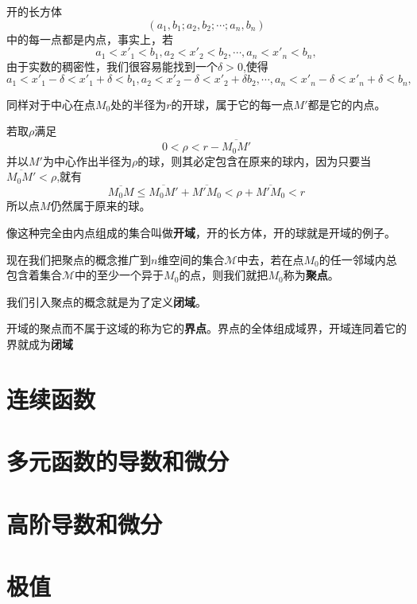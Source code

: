 \documentclass[lang=cn,10pt]{elegantbook}
\begin{document}
开的长方体
\begin{equation*}
		(a_{1},b_{1};a_{2},b_{2};\cdots;a_{n},b_{n})
\end{equation*}
中的每一点都是内点，事实上，若
\begin{equation*}
	a_{1}< x'_{1}< b_{1},a_{2}< x'_{2}< b_{2},\cdots,a_{n}< x'_{n}< b_{n},
\end{equation*}
由于实数的稠密性，我们很容易能找到一个$\delta>0$,使得
\begin{equation*}
	a_{1}< x'_{1}-\delta<x'_{1}+\delta< b_{1},a_{2}< x'_{2}-\delta<x'_{2}+\delta b_{2},\cdots,a_{n}< x'_{n}-\delta<x'_{n}+\delta< b_{n},
\end{equation*}

同样对于中心在点$M_{0}$处的半径为$r$的开球，属于它的每一点$M'$都是它的内点。

若取$\rho$满足
\begin{equation*}
	0<\rho<r-\overline{M_{0}M'}
\end{equation*}
并以$M'$为中心作出半径为$\rho$的球，则其必定包含在原来的球内，因为只要当$\overline{M_{0}M'}<\rho $,就有
\begin{equation*}
	\overline{M_{0}M}\le \overline{M_{0}M'} +\overline{M'M_{0}}<\rho +\overline{M'M_{0}}<r
\end{equation*}
所以点$M$仍然属于原来的球。

像这种完全由内点组成的集合叫做\textbf{开域}，开的长方体，开的球就是开域的例子。

现在我们把聚点的概念推广到$n$维空间的集合$\mathcal{M}$中去，若在点$M_{0}$的任一邻域内总包含着集合$\mathcal{M}$中的至少一个异于$M_{0}$的点，则我们就把$M_{0}$称为\textbf{聚点}。

我们引入聚点的概念就是为了定义\textbf{闭域}。

开域的聚点而不属于这域的称为它的\textbf{界点}。界点的全体组成域界，开域连同着它的界就成为\textbf{闭域}
\section{连续函数}
\section{多元函数的导数和微分}
\section{高阶导数和微分}
\section{极值}
\end{document}
